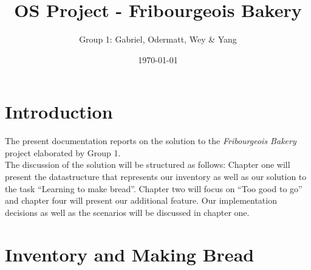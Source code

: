 \documentclass[11pt]{article}
\author{Group 1: Gabriel, Odermatt, Wey \& Yang}
\date{\today}
\title{OS Project - Fribourgeois Bakery}
\begin{document}
\maketitle
\tableofcontents

\setlength\parindent{0pt}

\section{Introduction}
\label{sec:orgd5ac86a}

The present documentation reports on the solution to the \emph{Fribourgeois Bakery} project elaborated by Group 1.\\

The discussion of the solution will be structured as follows: Chapter one will present the datastructure that represents our inventory as well as our solution to the task ``Learning to make bread''. Chapter two will focus on ``Too good to go'' and chapter four will present our additional feature. Our implementation decisions as well as the scenarios will be discussed in chapter one.\\

\section{Inventory and Making Bread}
\label{sec:orgb8b50e4}
\end{document}
